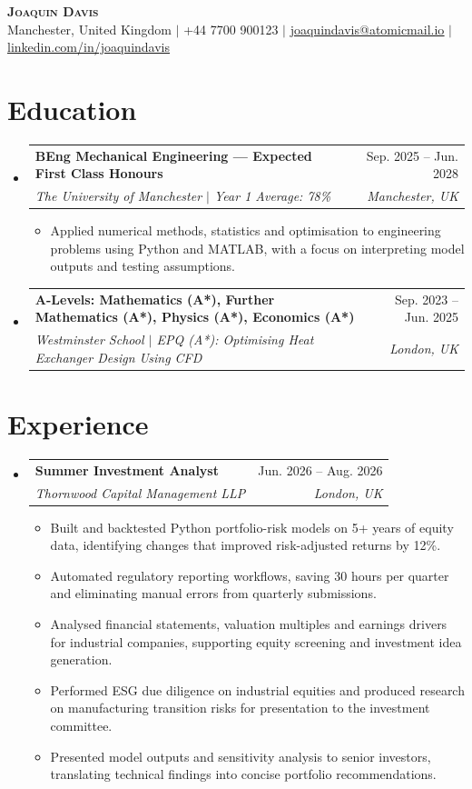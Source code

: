 \documentclass[a4paper,11pt]{article}
\makeatletter
\newcommand{\resumeItem}[1]{
  \item\small{{#1 \vspace{-1pt}}}
}
\newcommand{\resumeSubheading}[4]{
  \vspace{-2pt}\item
    \begin{tabular*}{0.97\textwidth}[t]{l@{\extracolsep{\fill}}r}
      \textbf{#1} & #2 \\
      \textit{\small #3} & \textit{\small #4} \\
    \end{tabular*}\vspace{-7pt}
}
\newcommand{\resumeSubHeadingListStart}{\begin{itemize}[leftmargin=0.15in,label={}]}
\newcommand{\resumeSubHeadingListEnd}{\end{itemize}}
\newcommand{\resumeItemListStart}{\begin{itemize}[leftmargin=0.22in]}
\newcommand{\resumeItemListEnd}{\end{itemize}\vspace{-4pt}}
\makeatother
\begin{document}
\begin{center}
  \textbf{\Huge \scshape Joaquin Davis} \\ \vspace{2pt}
  \small Manchester, United Kingdom $|$ +44 7700 900123 $|$
  \href{mailto:joaquindavis@atomicmail.io}{\underline{joaquindavis@atomicmail.io}} $|$
  \href{https://linkedin.com/in/joaquindavis}{\underline{linkedin.com/in/joaquindavis}}
\end{center}

\section{Education}
\resumeSubHeadingListStart
  \resumeSubheading
    {BEng Mechanical Engineering --- Expected First Class Honours}{Sep. 2025 -- Jun. 2028}
    {The University of Manchester $|$ Year 1 Average: 78\%}{Manchester, UK}
    \resumeItemListStart
      \resumeItem{Applied numerical methods, statistics and optimisation to engineering problems using Python and MATLAB, with a focus on interpreting model outputs and testing assumptions.}
    \resumeItemListEnd
  \resumeSubheading
    {A-Levels: Mathematics (A*), Further Mathematics (A*), Physics (A*), Economics (A*)}{Sep. 2023 -- Jun. 2025}
    {Westminster School $|$ EPQ (A*): Optimising Heat Exchanger Design Using CFD}{London, UK}
\resumeSubHeadingListEnd

\section{Experience}
\resumeSubHeadingListStart
  \resumeSubheading
    {Summer Investment Analyst}{Jun. 2026 -- Aug. 2026}
    {Thornwood Capital Management LLP}{London, UK}
    \resumeItemListStart
      \resumeItem{Built and backtested Python portfolio-risk models on 5+ years of equity data, identifying changes that improved risk-adjusted returns by 12\%.}
      \resumeItem{Automated regulatory reporting workflows, saving 30 hours per quarter and eliminating manual errors from quarterly submissions.}
      \resumeItem{Analysed financial statements, valuation multiples and earnings drivers for industrial companies, supporting equity screening and investment idea generation.}
      \resumeItem{Performed ESG due diligence on industrial equities and produced research on manufacturing transition risks for presentation to the investment committee.}
      \resumeItem{Presented model outputs and sensitivity analysis to senior investors, translating technical findings into concise portfolio recommendations.}
    \resumeItemListEnd
\resumeSubHeadingListEnd
\end{document}
